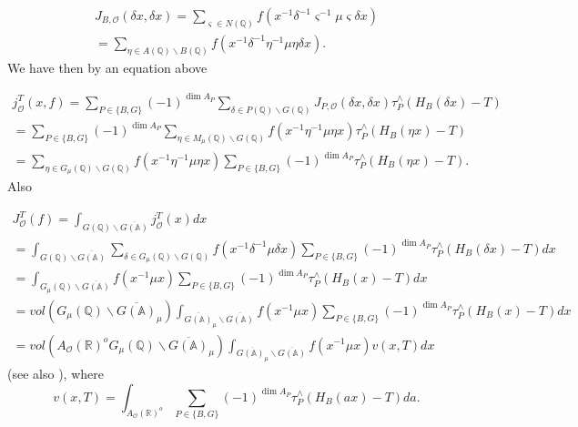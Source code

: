 \begin{equation}\label{eq:4.14}
\begin{array}{c}
J_{B,{\mathcal{O}}}(\delta x,\delta x)
=\sum_{\varsigma \in N( {\mathbb{Q}})}
f(x^{-1}\delta^{-1}\varsigma ^{-1}\mu \varsigma \delta x) \\ 
=\sum_{\eta \in A({\mathbb{Q}})\backslash B({\mathbb{Q}})}
f(x^{-1}\delta ^{-1}\eta^{-1}\mu \eta \delta x).
\end{array}
\end{equation}
We have then by an equation above

\begin{equation}\label{eq:4.15}
\begin{array}{c}
j_{\mathcal{O}}^T(x,f)
=\sum_{P\in \{B,G\}}(-1)^{\dim A_P}
\sum_{\delta \in P( {\mathbb{Q}})\backslash G({\mathbb{Q}})}
J_{P,{\mathcal{O}}}(\delta x,\delta x) \tau _P^{\wedge}(H_B(\delta x)-T) \\ 
=\sum_{P\in \{B,G\}}(-1)^{\dim A_P}
\sum_{\eta \in M_\mu ( {\mathbb{Q}})\backslash G({\mathbb{Q}})}
f(x^{-1}\eta ^{-1}\mu \eta x)\tau _P^{\wedge}(H_B(\eta x)-T) \\ 
=\sum_{\eta \in G_\mu ({\mathbb{Q}})\backslash G({\mathbb{Q}} )}
f(x^{-1}\eta ^{-1}\mu\eta x)
\sum_{P\in \{B,G\}}(-1)^{\dim A_P} \tau_P^{\wedge }(H_B(\eta x)-T).
\end{array}
\end{equation}
Also

\begin{equation}\label{eq:4.16}
\begin{array}{c}
J_{\mathcal{O}}^T(f)
=\int_{G({\mathbb{Q}})\backslash
\overline{G({\mathbb{A}})}}
j_{\mathcal{O}}^T(x)dx \\ 
=\int_{G({\mathbb{Q}})\backslash \overline{G({\mathbb{A}})}}
\sum_{\delta \in G_\mu ({\mathbb{Q}})\backslash G({\mathbb{Q}})}
f(x^{-1}\delta ^{-1}\mu \delta x)
\sum_{P\in\{B,G\}}(-1)^{\dim A_P}\tau _P^{\wedge }(H_B(\delta x)-T)dx \\ 
=\int_{G_\mu ({\mathbb{Q}})\backslash \overline{G({\mathbb{A}})}}
f(x^{-1}\mu x)\sum_{P\in\{B,G\}}(-1)^{\dim A_P}
\tau _P^{\wedge }(H_B(x)-T)dx \\ 
=vol(G_\mu ({\mathbb{Q}})\backslash \overline{G({\mathbb{A}})}_\mu)
\int_{\overline{G({\mathbb{A}})}_\mu\backslash \overline{G({\mathbb{A}})}}
f(x^{-1}\mu x)\sum_{P\in \{B,G\}}(-1)^{\dim A_P}
\tau_P^{\wedge }(H_B(x)-T)dx \\ 
=vol(A_{\mathcal{O}}({\mathbb{R}})^oG_\mu ({\mathbb{Q}})\backslash
\overline{G ({\mathbb{A}})}_\mu)
\int_{\overline{G ({\mathbb{A}})_\mu}\backslash \overline{G({\mathbb{A}})}}
f(x^{-1}\mu x)v(x,T)dx
\end{array}
\end{equation}
(see also \cite[(5.5)]{Sho}), where 
\begin{equation}\label{eq:4.17}
v(x,T)=\int_{A_{\mathcal{O}}({\mathbb{R}})^o}
\sum_{P\in \{B,G\}}(-1)^{\dim A_P}\tau_P^{\wedge }(H_B(ax)-T)da.
\end{equation}

